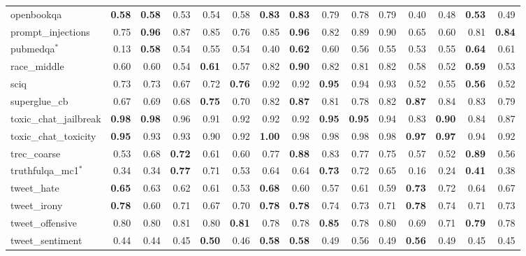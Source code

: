 \begin{table}[tbp]
{\begin{tabular}{lrrrrrrrrrrrrrr}
openbookqa & \textbf{0.58} & \textbf{0.58} & 0.53 & 0.54 & 0.58 & \textbf{0.83} & \textbf{0.83} & 0.79 & 0.78 & 0.79 & 0.40 & 0.48 & \textbf{0.53} & 0.49 \\
prompt\_injections & 0.75 & \textbf{0.96} & 0.87 & 0.85 & 0.76 & 0.85 & \textbf{0.96} & 0.82 & 0.89 & 0.90 & 0.65 & 0.60 & 0.81 & \textbf{0.84} \\
pubmedqa$^*$ & 0.13 & \textbf{0.58} & 0.54 & 0.55 & 0.54 & 0.40 & \textbf{0.62} & 0.60 & 0.56 & 0.55 & 0.53 & 0.55 & \textbf{0.64} & 0.61 \\
race\_middle & 0.60 & 0.60 & 0.54 & \textbf{0.61} & 0.57 & 0.82 & \textbf{0.90} & 0.82 & 0.81 & 0.82 & 0.58 & 0.52 & \textbf{0.59} & 0.53 \\
sciq & 0.73 & 0.73 & 0.67 & 0.72 & \textbf{0.76} & 0.92 & 0.92 & \textbf{0.95} & 0.94 & 0.93 & 0.52 & 0.55 & \textbf{0.56} & 0.52 \\
superglue\_cb & 0.67 & 0.69 & 0.68 & \textbf{0.75} & 0.70 & 0.82 & \textbf{0.87} & 0.81 & 0.78 & 0.82 & \textbf{0.87} & 0.84 & 0.83 & 0.79 \\
toxic\_chat\_jailbreak & \textbf{0.98} & \textbf{0.98} & 0.96 & 0.91 & 0.92 & 0.92 & 0.92 & \textbf{0.95} & \textbf{0.95} & 0.94 & 0.83 & \textbf{0.90} & 0.84 & 0.87 \\
toxic\_chat\_toxicity & \textbf{0.95} & 0.93 & 0.93 & 0.90 & 0.92 & \textbf{1.00} & 0.98 & 0.98 & 0.98 & 0.98 & \textbf{0.97} & \textbf{0.97} & 0.94 & 0.92 \\
trec\_coarse & 0.53 & 0.68 & \textbf{0.72} & 0.61 & 0.60 & 0.77 & \textbf{0.88} & 0.83 & 0.77 & 0.75 & 0.57 & 0.52 & \textbf{0.89} & 0.56 \\
truthfulqa\_mc1$^*$ & 0.34 & 0.34 & \textbf{0.77} & 0.71 & 0.53 & 0.64 & 0.64 & \textbf{0.73} & 0.72 & 0.65 & 0.16 & 0.24 & \textbf{0.41} & 0.38 \\
tweet\_hate & \textbf{0.65} & 0.63 & 0.62 & 0.61 & 0.53 & \textbf{0.68} & 0.60 & 0.57 & 0.61 & 0.59 & \textbf{0.73} & 0.72 & 0.64 & 0.67 \\
tweet\_irony & \textbf{0.78} & 0.60 & 0.71 & 0.67 & 0.70 & \textbf{0.78} & \textbf{0.78} & 0.74 & 0.73 & 0.71 & \textbf{0.78} & 0.74 & 0.71 & 0.73 \\
tweet\_offensive & 0.80 & 0.80 & 0.81 & 0.80 & \textbf{0.81} & 0.78 & 0.78 & \textbf{0.85} & 0.78 & 0.80 & 0.69 & 0.71 & \textbf{0.79} & 0.78 \\
tweet\_sentiment & 0.44 & 0.44 & 0.45 & \textbf{0.50} & 0.46 & \textbf{0.58} & \textbf{0.58} & 0.49 & 0.56 & 0.49 & \textbf{0.56} & 0.49 & 0.45 & 0.45 \\

\end{tabular}}
\end{table}

